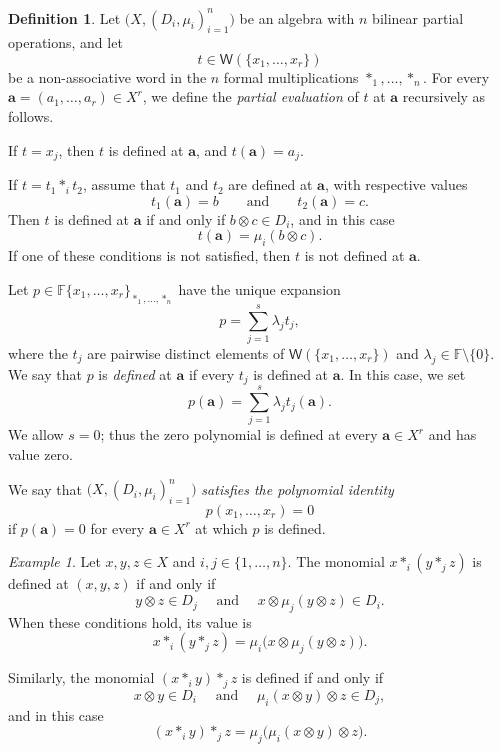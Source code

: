 \documentclass[reqno,a4paper]{amsart}
\theoremstyle{plain}
\theoremstyle{definition}
\newtheorem{definition}[subsection]{Definition}
\theoremstyle{remark}
\newtheorem{example}[subsection]{Example}
\numberwithin{equation}{section}
\newcommand{\F}{\mathbb{F}}
\begin{document}
\begin{definition}\label{DefPartialEvaluationN}
Let $\bigl(X,(D_i,\mu_i)_{i=1}^n\bigr)$ be an algebra with $n$ bilinear partial operations, and let
\[
t\in\mathsf{W}(\{x_1,\ldots,x_r\})
\]
be a non-associative word in the $n$ formal multiplications $\ast_1,\ldots,\ast_n$. For every $\mathbf a=(a_1,\ldots,a_r)\in X^r$, we define the \emph{partial evaluation} of $t$ at $\mathbf a$ recursively as follows.

If $t=x_j$, then $t$ is defined at $\mathbf a$, and $t(\mathbf a)=a_j$.

If $t=t_1\ast_i t_2$, assume that $t_1$ and $t_2$ are defined at $\mathbf a$, with respective values
\[
t_1(\mathbf a)=b
\qquad\text{and}\qquad
t_2(\mathbf a)=c.
\]
Then $t$ is defined at $\mathbf a$ if and only if $b\otimes c\in D_i$, and in this case
\[
t(\mathbf a)=\mu_i(b\otimes c).
\]
If one of these conditions is not satisfied, then $t$ is not defined at $\mathbf a$.

Let $p\in\F\{x_1,\ldots,x_r\}_{\ast_1,\ldots,\ast_n}$ have the unique expansion
\[
p=\sum_{j=1}^{s}\lambda_jt_j,
\]
where the $t_j$ are pairwise distinct elements of $\mathsf{W}(\{x_1,\ldots,x_r\})$ and $\lambda_j\in\F\setminus\{0\}$. We say that $p$ is \emph{defined} at $\mathbf a$ if every $t_j$ is defined at $\mathbf a$. In this case, we set
\[
p(\mathbf a)=\sum_{j=1}^{s}\lambda_jt_j(\mathbf a).
\]
We allow $s=0$; thus the zero polynomial is defined at every $\mathbf a\in X^r$ and has value zero.

We say that $\bigl(X,(D_i,\mu_i)_{i=1}^n\bigr)$ \emph{satisfies the polynomial identity}
\[
p(x_1,\ldots,x_r)=0
\]
if $p(\mathbf a)=0$ for every $\mathbf a\in X^r$ at which $p$ is defined.
\end{definition}

\begin{example}
Let $x,y,z\in X$ and $i,j\in\{1,\ldots,n\}$. The monomial $x\ast_i(y\ast_j z)$ is defined at $(x,y,z)$ if and only if
\[
y\otimes z\in D_j \quad \text{ and } \quad x\otimes\mu_j(y\otimes z)\in D_i.
\]
When these conditions hold, its value is
\[
x\ast_i(y\ast_j z)
=
\mu_i\bigl(
x\otimes\mu_j(y\otimes z)
\bigr).
\]

Similarly, the monomial $(x\ast_i y)\ast_j z$ is defined if and only if
\[
x\otimes y\in D_i \quad \text{ and } \quad \mu_i(x\otimes y)\otimes z\in D_j,
\]
and in this case
\[
(x\ast_i y)\ast_j z
=
\mu_j\bigl(
\mu_i(x\otimes y)\otimes z
\bigr).
\]
\end{example}
\end{document}
